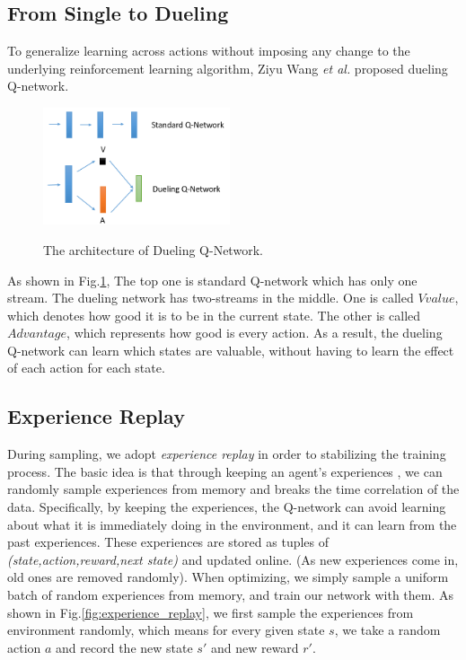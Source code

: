 \subsection{From Single to Dueling}
To generalize learning across actions without imposing any change to the underlying reinforcement learning algorithm, Ziyu Wang \textit{et al.}\cite{wang2015dueling} proposed dueling Q-network.

\begin{figure}[ht!]
	\centering
	\includegraphics[width=0.49\textwidth]{./fig/dueling.png} \\
	\caption{The architecture of Dueling Q-Network.}
	\label{fig:dueling_q_network}
\end{figure}

As shown in Fig.\ref{fig:dueling_q_network}, The top one is standard Q-network which has only one stream. 
%
The dueling network has two-streams in the middle. One is called $V value$, which denotes how good it is to be in the current state. The other is called $Advantage$, which represents how good is every action.
%
As a result, the dueling Q-network can learn which states are valuable, without having to learn the effect of each action for each state. 

\subsection{Experience Replay}

During sampling, we adopt \textit{experience replay}\cite{adam2012experience} in order to stabilizing the training process.
%
The basic idea is that through keeping an agent’s experiences , we can randomly sample experiences from memory and breaks the time correlation of the data.
%
Specifically, by keeping the experiences, the Q-network can avoid learning about what it is immediately doing in the environment, and it can learn from the past experiences. 
%
These experiences are stored as tuples of \textit{(state,action,reward,next state)} and updated online. (As new experiences come in, old ones are removed randomly). 
%
When optimizing, we simply sample a uniform batch of random experiences from memory, and train our network with them.
%
As shown in Fig.\ref{fig:experience_replay}, we first sample the experiences from environment randomly, which means for every given state $s$, we take a random action $a$ and record the new state $s'$ and new reward $r'$.

